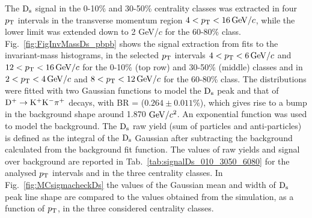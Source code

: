  The ${\rm D_s}$ signal in the 0-10$\%$ and 30-50\% centrality classes was extracted in four $p_{\rm T}$ 
 intervals in the transverse momentum region $4 < p_{\rm T} <16 \, \mathrm{GeV}/c$, while the lower limit was extended down to 2 GeV/$c$
for the 60-80\% class. Fig.~\ref{fig:FigInvMassDs_pbpb} shows the signal extraction
from fits to the invariant-mass histograms, in the selected $p_{\rm T}$ intervals
$4 < p_{\rm T} <6 \, \mathrm{GeV}/c$ and $12 < p_{\rm T} < 16 \, \mathrm{GeV}/c$ for the 0-10\% (top row) and 30-50\%
(middle) classes and in $2 < p_{\rm T} < 4 \, \mathrm{GeV}/c$ and  $8 < p_{\rm T} < 12 \, \mathrm{GeV}/c$ for
the 60-80\% class. The distributions were fitted with two Gaussian functions to model
the ${\rm D_s}$ peak and that of ${\rm D^{+}\to K^+ K^-\pi^+}$ decays, with BR = ($0.264 \pm 0.011\%$),
which gives rise to a bump in the background shape around 1.870 $\mathrm{GeV}/c^{2}$. 
An exponential function was used to model the background.
The ${\rm D_s}$ raw yield (sum of particles and anti-particles) is defined as the integral of the ${\rm D_s}$ Gaussian 
after subtracting the background calculated from the 
background fit function. 
The values of raw yields and signal over background are reported in
Tab.~\ref{tab:signalDs_010_3050_6080} for the analysed $p_{\rm T}$ intervals and in the three centrality classes.
In Fig.~\ref{fig:MCsigmacheckDs} the values of the Gaussian mean and width of ${\rm D_s}$ 
peak line shape are compared to the values obtained from the simulation, as a function of $p_{\rm T}$, in the 
three considered centrality classes.

